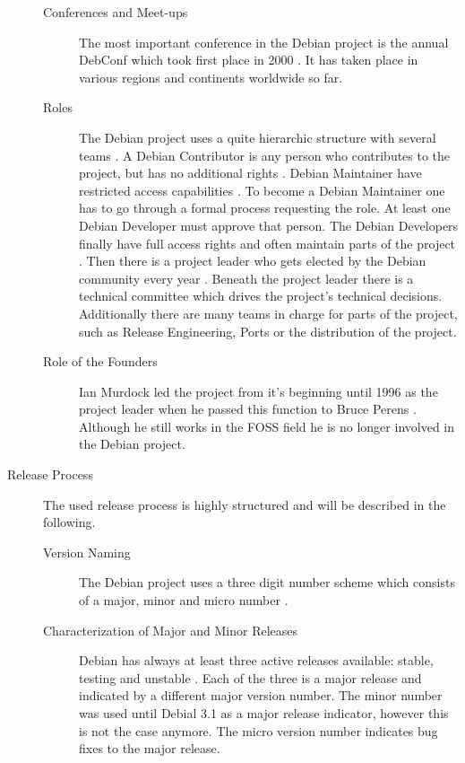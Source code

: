 \begin{description}
\begin{description}
    \item[Conferences and Meet-ups] The most important conference in the Debian
      project is the annual DebConf which took first place in 2000
      \cite{DebianDebConf}. It has taken place in various regions and
      continents worldwide so far.

    \item[Roles] The Debian project uses a quite hierarchic structure with
      several teams \cite{DebianOrg,Sadowski2008}. A Debian Contributor is any
      person who contributes to the project, but has no additional rights
      \cite{DebianFAQ}. Debian Maintainer have restricted access capabilities
      \cite{DebianMaintainer}. To become a Debian Maintainer one has to go
      through a formal process requesting the role. At least one Debian
      Developer must approve that person. The Debian Developers finally have
      full access rights and often maintain parts of the project
      \cite{DebianDev}. Then there is a project leader who gets elected by the
      Debian community every year \cite{DebianOrg,DebianVoting}. Beneath the
      project leader there is a technical committee which drives the project's
      technical decisions. Additionally there are many teams in charge for
      parts of the project, such as Release Engineering, Ports or the
      distribution of the project.

    \item[Role of the Founders] Ian Murdock led the project from it's beginning
      until 1996 as the project leader when he passed this function to Bruce
      Perens \cite{DebianFAQ,DebianHistory}. Although he still works in the
      \ac{FOSS} field he is no longer involved in the Debian project.

  \end{description}

  \item[Release Process] The used release process is highly structured and will
    be described in the following.

  \begin{description}

    \item[Version Naming] The Debian project uses a three digit number scheme
      which consists of a major, minor and micro number \cite{DebianReleases}.

    \item[Characterization of Major and Minor Releases] Debian has always at
      least three active releases available: stable, testing and unstable
      \cite{DebianReleases,DebianReleaseManagement}. Each of the three is a
      major release and indicated by a different major version number. The
      minor number was used until Debial 3.1 as a major release indicator,
      however this is not the case anymore. The micro version number indicates
      bug fixes to the major release.


\end{description}
\end{description}
